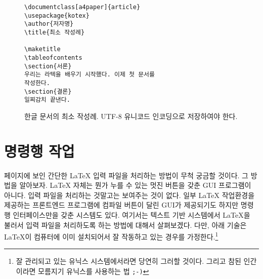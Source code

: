 \begin{figure}[!p]
\begin{lined}{10cm}
\begin{verbatim}
\documentclass[a4paper]{article}
\usepackage{kotex}
\author{저자명}
\title{최소 작성례}

\maketitle
\tableofcontents
\section{서론}
우리는 라텍을 배우기 시작했다. 이제 첫 문서를
작성한다.
\section{결론}
일찌감치 끝낸다.

\end{verbatim}
\end{lined}
\caption[한글 문서의 예]{한글 문서의 최소 작성례. UTF-8 유니코드 인코딩으로 저장하여야 한다.}\label{minikor}

\end{figure}


\section{명령행 작업}

\pageref{mini}페이지에 보인 간단한 \LaTeX{} 입력 파일을 처리하는 방법이 무척 궁금할 것이다.
그 방법을 알아보자.
\LaTeX{} 자체는 뭔가 누를 수 있는 멋진 버튼을 갖춘 GUI 프로그램이 아니다.
입력 파일을 처리하는 것말고는 보여주는 것이 없다.
일부 \LaTeX{} 작업환경을 제공하는 프론트엔드 프로그램에 컴파일 버튼이 달린 GUI가 제공되기도 하지만
명령행 인터페이스만을 갖춘 시스템도 있다. 여기서는 텍스트 기반 시스템에서 
\LaTeX 을 불러서 입력 파일을 처리하도록 하는 방법에 대해서 살펴보겠다.
다만, 아래 기술은 \LaTeX 이 컴퓨터에 이미 설치되어서 잘 작동하고 있는 경우를 가정한다.\footnote{%
  잘 관리되고 있는 유닉스 시스템에서라면 당연히 그러할 것이다. 그리고 참된 인간이라면 모름지기 유닉스를 사용하는 법\hdots\hdots{} \texttt{;-)}
}

